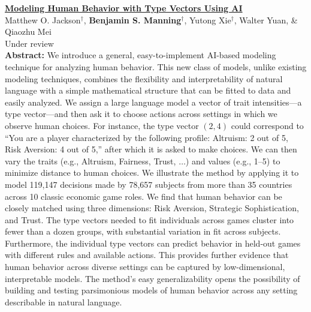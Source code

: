 \documentclass[11pt]{article}
\newenvironment{publist}
  {\begin{list}{}{%
    \setlength{\leftmargin}{1.5em}%
    \setlength{\itemindent}{-1.5em}%
    \setlength{\itemsep}{10pt}%
    \setlength{\parsep}{0pt}%
    \setlength{\topsep}{4pt}}}
  {\end{list}}
\begin{document}
\begin{publist}
\item \href{https://arxiv.org/abs/2608.18265}{\textbf{Modeling Human Behavior with Type Vectors Using AI}}\\
Matthew O. Jackson$^\dagger$, \textbf{Benjamin S. Manning}$^\dagger$, Yutong Xie$^\dagger$, Walter Yuan, \& Qiaozhu Mei\\
Under review\\[3pt]
{\footnotesize \textbf{Abstract: }
We introduce a general, easy-to-implement AI-based modeling technique for analyzing human behavior.
This new class of models, unlike existing modeling techniques, combines the flexibility and interpretability of natural language with a simple mathematical structure that can be fitted to data and easily analyzed.
We assign a large language model a vector of trait intensities---a type vector---and then ask it to choose actions across settings in which we observe human choices.
For instance, the type vector $(2,4)$ could correspond to ``You are a player characterized by the following profile: Altruism: 2 out of 5, Risk Aversion: 4 out of 5,'' after which it is asked to make choices.
We can then vary the traits (e.g., Altruism, Fairness, Trust, $\dots$) and values (e.g., 1--5) to minimize distance to human choices.
We illustrate the method by applying it to model 119,147 decisions made by 78,657 subjects from more than 35 countries across 10 classic economic game roles.
We find that human behavior can be closely matched using three dimensions: Risk Aversion, Strategic Sophistication, and Trust.
The type vectors needed to fit individuals across games cluster into fewer than a dozen groups, with substantial variation in fit across subjects.
Furthermore, the individual type vectors can predict behavior in held-out games with different rules and available actions.
This provides further evidence that human behavior across diverse settings can be captured by low-dimensional, interpretable models.
The method's easy generalizability opens the possibility of building and testing parsimonious models of human behavior across any setting describable in natural language.}


\end{publist}
\end{document}
